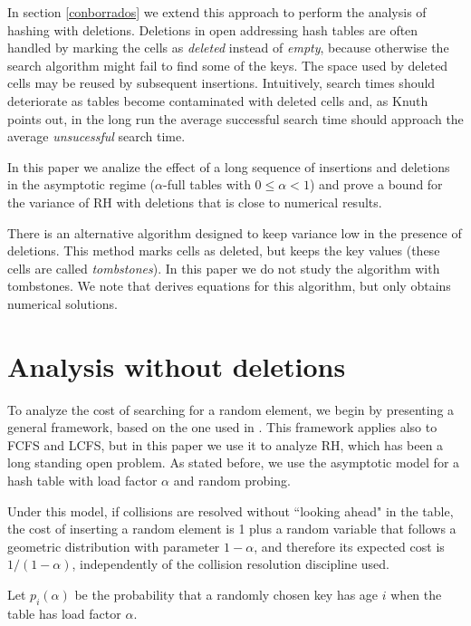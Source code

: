 \documentclass[proceedings]{aofa}
\begin{document}
In section \ref{conborrados} we extend this approach
to perform the analysis of hashing with deletions. 
Deletions in open addressing hash tables are often handled by marking the
cells as {\em deleted} instead of {\em empty}, because otherwise the
search algorithm might fail to find some of the keys.
The space used by deleted cells may be reused by subsequent
insertions.
Intuitively, search times should deteriorate as tables become
contaminated with deleted cells and, as Knuth\cite{Knuth3} points out,
in the long run the average successful search time should approach the
average {\em unsucessful} search time.

In this paper we analize the effect of a long sequence of insertions
and deletions in the asymptotic regime ($\alpha$-full tables with $0\leq
\alpha < 1$)
and prove a bound for the variance of RH with deletions that is close to numerical results.

There is an alternative algorithm designed to keep variance low in the presence of deletions. This method marks cells as deleted, but keeps the key values (these cells are called {\em tombstones}).
In this paper we do not study the algorithm with tombstones.
We note that \cite{Mit} derives equations for this algorithm, but only obtains
numerical solutions.


\section{Analysis without deletions}
\label{sinborrar}
To analyze the cost of searching for a random element, we begin by presenting a general framework, 
based on the one used in \cite{cunto1988two}. 
This framework applies also to FCFS and LCFS, but in this paper
we use it to analyze RH, which has been a long standing open problem.
As stated before, we use the asymptotic model for a hash table with load factor $\alpha$ and random probing.

Under this model, if collisions are resolved without ``looking ahead" in the table, the cost of inserting a random element is 1 plus a random variable that follows
a geometric distribution with parameter $1-\alpha$, and therefore its expected cost is $1/(1-\alpha)$, independently of the collision resolution discipline used.

Let $p_i(\alpha)$ be the probability that a randomly chosen key has
age $i$ when the table has load factor $\alpha$.
\end{document}
